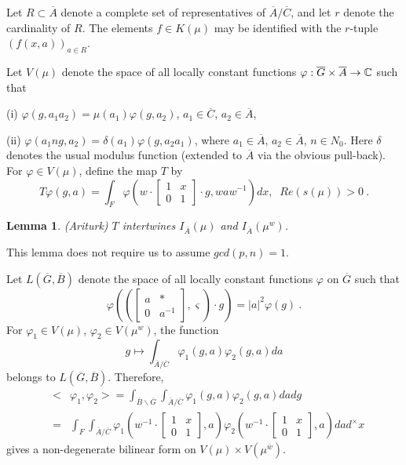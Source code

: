 \documentclass[twocolumn,10pt]{article}
\newtheorem{lemma}[theorem]{Lemma}
\begin{document}
\noindent
Let $R\subset \overline{A}$ denote a complete set of 
representatives of 
$\overline{A}/\overline{C}$, and let $r$ denote the 
cardinality of $R$.
The elements $f\in K(\mu )$ may be identified with 
the $r$-tuple $%
(f(x,a))_{a\in R}$.

Let $V(\mu )$ denote the space of all locally constant 
functions 
$\varphi :\overline{G}\times \overline{A}\rightarrow 
{\Bbb C}$ such that

(i) $\varphi (g,a_1a_2)=\mu (a_1)\varphi (g,a_2)$, 
$a_1\in \overline{C}$, $a_2\in \overline{A}$,

(ii) $\varphi (a_1ng,a_2)=\delta (a_1)\varphi (g,a_2a_1)$, 
where $a_1\in 
\overline{A}$, $a_2\in \overline{A}$, $n\in N_0$.
\noindent
Here $\delta $ denotes the usual modulus function 
(extended to $\overline{A}$ via the obvious 
pull-back). For $\varphi \in V(\mu )$, define
the map $T$ by
\[
T\varphi (g,a)=\int_F\varphi (w\cdot \left[ 
\begin{array}{cc}
1 & x \\ 
0 & 1
\end{array}
\right] \cdot g,waw^{-1})dx,\;\;Re(s(\mu ))>0\ . 
\]

\begin{lemma} 
(Ariturk)
$T$ intertwines $I_{\overline{A}}(\mu )$ and 
$I_{\overline{A}}(\mu ^w)$.
\end{lemma}

This lemma does not require us to assume $gcd(p,n)=1$.

Let $L(\overline{G},\overline{B})$ denote the space 
of all locally
constant functions $\varphi $ on $\overline{G}$ 
such that 
\[
\varphi ((\left[ 
\begin{array}{cc}
a & * \\ 
0 & a^{-1}
\end{array}
\right] ,\varsigma )\cdot g)=|a|^2\varphi (g)\ .
\]
For $\varphi _1\in V(\mu )$, $\varphi _2\in V(\mu ^w)$, 
the function 
\[
g\longmapsto \int_{\overline{A}/\overline{C}}
\varphi _1(g,a)\varphi
_2(g,a)da 
\]
belongs to $L(\overline{G},\overline{B})$. Therefore, 
\begin{eqnarray*}
&<&\varphi _1,\varphi _2>=\int_{\overline{B}\backslash 
\overline{G}}
\int_{\overline{A}/\overline{C}}
\varphi _1(g,a)\varphi _2(g,a)dadg \\
&=&\int_F\int_{\overline{A}/\overline{C}}
\varphi _1(w^{-1}\cdot \left[ 
\begin{array}{cc}
1 & x \\ 
0 & 1
\end{array}
\right] ,a)\varphi _2(w^{-1}\cdot \left[ 
\begin{array}{cc}
1 & x \\ 
0 & 1
\end{array}
\right] ,a)dad^{\times }x
\end{eqnarray*}
gives a non-degenerate bilinear form on 
$V(\mu )\times V(\mu ^{\overline{w}})$.
\end{document}
